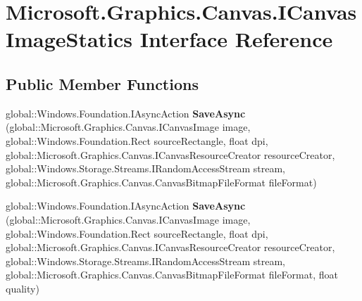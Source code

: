 \hypertarget{interface_microsoft_1_1_graphics_1_1_canvas_1_1_i_canvas_image_statics}{}\section{Microsoft.\+Graphics.\+Canvas.\+I\+Canvas\+Image\+Statics Interface Reference}
\label{interface_microsoft_1_1_graphics_1_1_canvas_1_1_i_canvas_image_statics}
\subsection*{Public Member Functions}
\begin{DoxyCompactItemize}
\item 
\mbox{\label{interface_microsoft_1_1_graphics_1_1_canvas_1_1_i_canvas_image_statics_a24c2e03f2a0d0284e0926c456f6c05cd}} 
global\+::\+Windows.\+Foundation.\+I\+Async\+Action {\bfseries Save\+Async} (global\+::\+Microsoft.\+Graphics.\+Canvas.\+I\+Canvas\+Image image, global\+::\+Windows.\+Foundation.\+Rect source\+Rectangle, float dpi, global\+::\+Microsoft.\+Graphics.\+Canvas.\+I\+Canvas\+Resource\+Creator resource\+Creator, global\+::\+Windows.\+Storage.\+Streams.\+I\+Random\+Access\+Stream stream, global\+::\+Microsoft.\+Graphics.\+Canvas.\+Canvas\+Bitmap\+File\+Format file\+Format)
\item 
\mbox{\label{interface_microsoft_1_1_graphics_1_1_canvas_1_1_i_canvas_image_statics_a1d356baa8a7f7e5d8a5a583ba30a2008}} 
global\+::\+Windows.\+Foundation.\+I\+Async\+Action {\bfseries Save\+Async} (global\+::\+Microsoft.\+Graphics.\+Canvas.\+I\+Canvas\+Image image, global\+::\+Windows.\+Foundation.\+Rect source\+Rectangle, float dpi, global\+::\+Microsoft.\+Graphics.\+Canvas.\+I\+Canvas\+Resource\+Creator resource\+Creator, global\+::\+Windows.\+Storage.\+Streams.\+I\+Random\+Access\+Stream stream, global\+::\+Microsoft.\+Graphics.\+Canvas.\+Canvas\+Bitmap\+File\+Format file\+Format, float quality)
\item 
\mbox{\label{interface_microsoft_1_1_graphics_1_1_canvas_1_1_i_canvas_image_statics_a21753a6236cd5f5b4187172eb1f59d72}} 

\end{DoxyCompactItemize}
